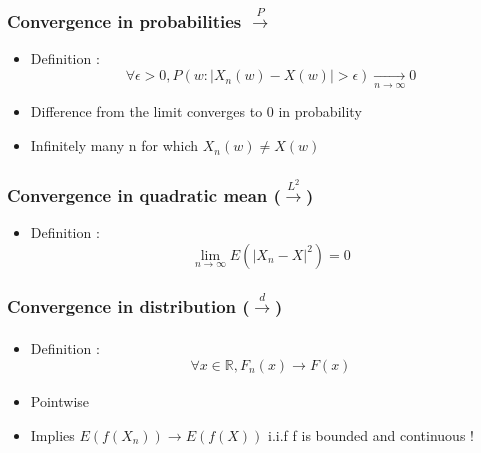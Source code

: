 \documentclass{article}
\begin{document}
\subsubsection{Convergence in probabilities $\xrightarrow{P}$}
\begin{itemize}
    \item Definition : 
    \begin{equation}
        \forall \epsilon>0, P(w:|X_n(w)-X(w)|>\epsilon) \xrightarrow[n\to\infty]{}0
    \end{equation}
    \item Difference from the limit converges to 0 in probability
    \item Infinitely many n for which $X_n(w) \neq X(w)$
\end{itemize}
\subsubsection{Convergence in quadratic mean ($\xrightarrow{L^2}$)}
\begin{itemize}
    \item Definition  : 
    \begin{equation}
        \lim_{n\to\infty}E(|X_n-X|^2)=0
    \end{equation}
\end{itemize}
\subsubsection{Convergence in distribution ($\xrightarrow[]{d}$)}
\begin{itemize}
    \item Definition : 
    \begin{equation}
        \forall x\in\mathbb{R}, F_n(x)\xrightarrow[]{}F(x)
    \end{equation}
    \item Pointwise
    \item Implies $E(f(X_n)) \xrightarrow{}E(f(X))$ i.i.f f is bounded and continuous ! 
\end{itemize}
\end{document}

